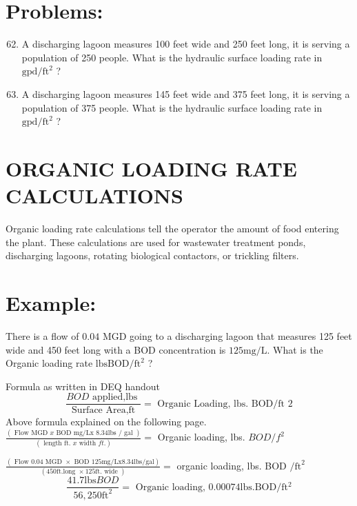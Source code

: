 \documentclass[10pt]{article}
\begin{document}
\section{Problems:}
\begin{enumerate}
  \setcounter{enumi}{61}
  \item A discharging lagoon measures 100 feet wide and 250 feet long, it is serving a population of 250 people. What is the hydraulic surface loading rate in $\mathrm{gpd} / \mathrm{ft}^{2}$ ?

  \item A discharging lagoon measures 145 feet wide and 375 feet long, it is serving a population of 375 people. What is the hydraulic surface loading rate in $\mathrm{gpd} / \mathrm{ft}^{2}$ ?

\end{enumerate}
\section{ORGANIC LOADING RATE CALCULATIONS}
Organic loading rate calculations tell the operator the amount of food entering the plant. These calculations are used for wastewater treatment ponds, discharging lagoons, rotating biological contactors, or trickling filters.

\section{Example:}
There is a flow of $0.04$ MGD going to a discharging lagoon that measures 125 feet wide and 450 feet long with a BOD concentration is $125 \mathrm{mg} / \mathrm{L}$. What is the Organic loading rate $\mathrm{lbs} \mathrm{BOD} / \mathrm{ft}^{2}$ ?

Formula as written in DEQ handout
$$
\frac{B O D \text { applied,lbs }}{\text { Surface Area,ft }}=\text { Organic Loading, lbs. BOD/ft } 2
$$
Above formula explained on the following page. $\frac{(\text { Flow MGD } x \text { BOD mg/Lx 8.34lbs } / \text { gal })}{(\text { length ft. } x \text { width } f t .)}=$ Organic loading, lbs. $B O D / f^{2}$

$\frac{(\text { Flow } 0.04 \text { MGD } \times \text { BOD } 125 \mathrm{mg} / \mathrm{Lx} 8.34 \mathrm{lbs} / \mathrm{gal})}{(450 \mathrm{ft} \text {.long } \times 125 \mathrm{ft} \text {. wide })}=$ organic loading, lbs. BOD $/ \mathrm{ft}^{2}$
$$
\frac{41.7 \mathrm{lbs} B O D}{56,250 \mathrm{ft}^{2}}=\text { Organic loading, } 0.00074 \mathrm{lbs.} \mathrm{BOD} / \mathrm{ft}{ }^{2}
$$
\end{document}
